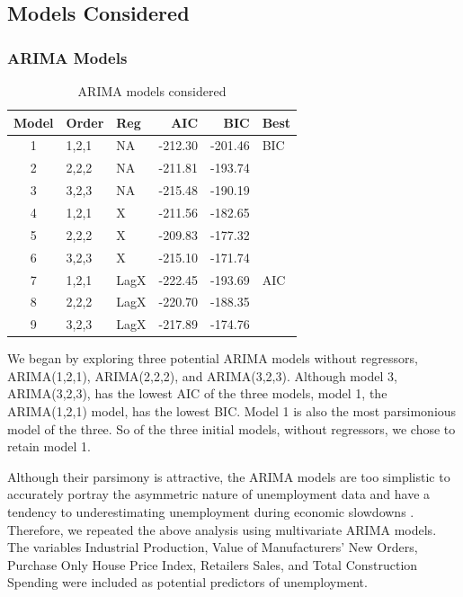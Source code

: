 \documentclass[twoside,twocolumn]{article}
\begin{document}
\subsection{Models Considered}

\subsubsection{ARIMA Models}
\begin{table}[htb]
\centering
\caption{ARIMA models considered}
\label{tab:arimachoices}
\begin{tabular}{cllrrl}
  \hline
 Model & Order & Reg  & AIC & BIC & Best \\
  \hline
1 & 1,2,1 &  NA &   -212.30 & -201.46 & BIC \\
  2  & 2,2,2 & NA   & -211.81 & -193.74 &  \\
  3  & 3,2,3 &  NA  & -215.48 & -190.19 &  \\
  4  & 1,2,1 & X  & -211.56 & -182.65 &  \\
  5  & 2,2,2 & X   & -209.83 & -177.32 &  \\
  6  & 3,2,3 & X   & -215.10 & -171.74 &  \\
  7  & 1,2,1 &  LagX & -222.45 & -193.69 & AIC \\
  8  & 2,2,2 &  LagX & -220.70 & -188.35 &  \\
  9  & 3,2,3 &  LagX & -217.89 & -174.76 &  \\
   \hline
\end{tabular}
\end{table}

We began by exploring three potential ARIMA models without regressors, ARIMA(1,2,1), ARIMA(2,2,2), and ARIMA(3,2,3). Although model 3, ARIMA(3,2,3), has the lowest AIC of the three models, model 1, the ARIMA(1,2,1) model, has the lowest BIC. Model 1 is also the most parsimonious model of the three. So of the three initial models, without regressors, we chose to retain model 1.

Although their parsimony is attractive, the ARIMA models are too simplistic to accurately portray the asymmetric nature of unemployment data and have a tendency to underestimating unemployment during economic slowdowns \citep{Montgomery1998}. Therefore, we repeated the above analysis using multivariate ARIMA models.  The variables Industrial Production, Value of Manufacturers' New Orders, Purchase Only House Price Index,  Retailers Sales, and Total Construction Spending were included as potential predictors of unemployment.
\end{document}
